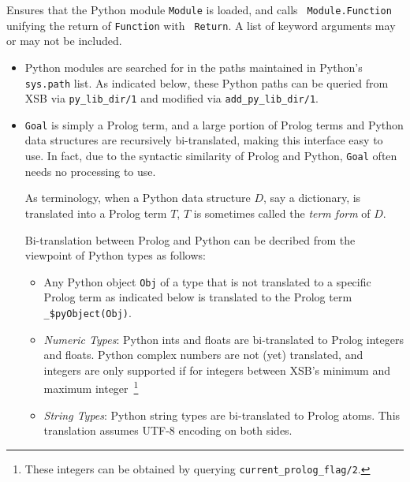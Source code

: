 \begin{description}

%
 Ensures that the Python module {\tt Module} is loaded, and calls {\tt
   Module.Function} unifying the return of {\tt Function} with {\tt
   Return}.  A list of keyword arguments may or may not be included.

 \begin{itemize}
   \item Python modules are searched for in the paths maintained in
     Python's {\tt sys.path} list.  As indicated below, these Python
     paths can be queried from XSB via {\tt py\_lib\_dir/1} and
     modified via {\tt add\_py\_lib\_dir/1}.
     
   \item {\tt Goal} is simply a Prolog term, and a large portion of
     Prolog terms and Python data structures are recursively
     bi-translated, making this interface easy to use.  In fact, due
     to the syntactic similarity of Prolog and Python, {\tt Goal}
     often needs no processing to use.

     As terminology, when a Python data structure $D$, say a
     dictionary, is translated into a Prolog term $T$, $T$ is
     sometimes called the {\em term form} of $D$.

     Bi-translation between Prolog and Python can be decribed from the
     viewpoint of Python types as follows:
     \begin{itemize}
     \item Any Python object {\tt Obj} of a type that is not
       translated to a specific Prolog term as indicated below is
       translated to the Prolog term {\tt \_\$pyObject(Obj)}.
       \item {\em Numeric Types}: Python ints and floats are
         bi-translated to Prolog integers and floats.  Python complex
         numbers are not (yet) translated, and integers are only
         supported if for integers between XSB's minimum and maximum
         integer~\footnote{These integers can be obtained by querying
           {\tt current\_prolog\_flag/2}.}
       \item {\em String Types}: Python string types are bi-translated
         to Prolog atoms.  This translation assumes UTF-8 encoding on
         both sides.


\end{itemize}
\end{itemize}
\end{description}
